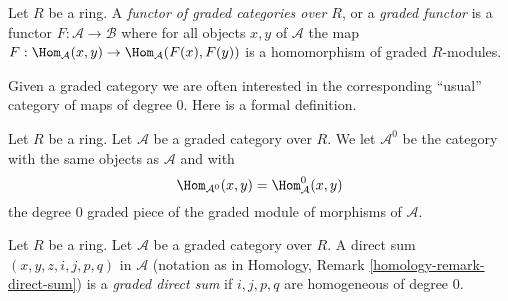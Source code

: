 \begin{definition}
\label{definition-functor-graded-categories}
Let $R$ be a ring. A {\it functor of graded categories over $R$}, or a
{\it graded functor}
is a functor $F : \mathcal{A} \to \mathcal{B}$ where for all objects
$x, y$ of $\mathcal{A}$ the map
$F : \Hom_\mathcal{A}(x, y) \to \Hom_\mathcal{A}(F(x), F(y))$
is a homomorphism of graded $R$-modules.
\end{definition}

\noindent
Given a graded category we are often interested in the
corresponding ``usual'' category of maps of degree $0$.
Here is a formal definition.

\begin{definition}
\label{definition-H0-of-graded-category}
Let $R$ be a ring. Let $\mathcal{A}$ be a graded category
over $R$. We let {\it $\mathcal{A}^0$} be the category with the
same objects as $\mathcal{A}$ and with
$$
\Hom_{\mathcal{A}^0}(x, y) = \Hom^0_\mathcal{A}(x, y)
$$
the degree $0$ graded piece of the graded module of morphisms of
$\mathcal{A}$.
\end{definition}

\begin{definition}
\label{definition-graded-direct-sum}
Let $R$ be a ring. Let $\mathcal{A}$ be a graded category over $R$.
A direct sum $(x, y, z, i, j, p, q)$ in $\mathcal{A}$ (notation as in
Homology, Remark \ref{homology-remark-direct-sum})
is a {\it graded direct sum} if $i, j, p, q$ are homogeneous
of degree $0$.
\end{definition}

